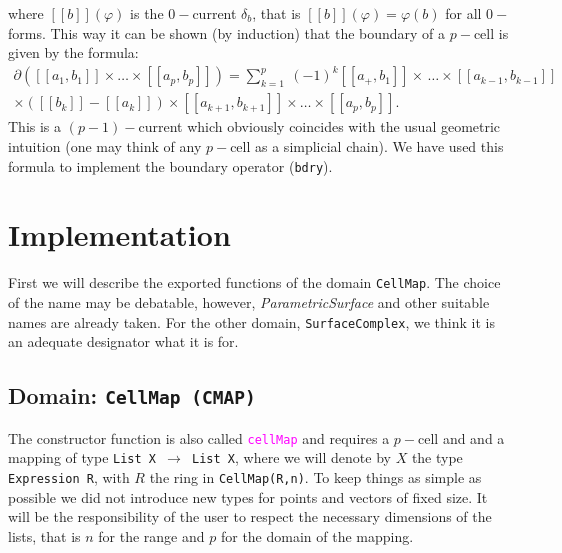\documentclass[12pt,a4paper]{article}
\newcommand{\spadfun}[1]{\textcolor{magenta}{\tt #1}}
\begin{document}
where $[[b]](\varphi)$ is the $0-$current $\delta_b$, that is
$[[b]](\varphi)=\varphi(b)$ for all $0-$forms. This way it can 
be shown (by induction) that the boundary of a $p-$cell is given
by the formula:
\begin{eqnarray*}
 \partial([[a_1,b_1]]\times\ldots\times[[a_p,b_p]]) = \sum_{k=1}^p\ 
 (-1)^k [[a_+,b_1]]\times\,\ldots\times[[a_{k-1},b_{k-1}]] \\ 
 \times([[b_k]] - [[a_k]])\times [[a_{k+1},b_{k+1}]]\times\ldots\times
 [[a_{p},b_{p}]].
\end{eqnarray*}
This is a $(p-1)-$current which obviously coincides
with the usual geometric intuition (one may think of any $p-$cell as
a simplicial chain). We have used this formula to implement the boundary
operator ({\tt bdry}). 
%
\section{Implementation}
First we will describe the exported functions of the domain
{\tt CellMap}. The choice of the name may be debatable, however,
{\em ParametricSurface} and other suitable names are already taken.
For the other domain, {\tt SurfaceComplex}, we think it is an 
adequate designator what it is for.
\subsection{Domain: {\tt CellMap (CMAP)}}
The constructor function is also called \spadfun{cellMap} and requires
a $p-$cell and and a mapping of type {\tt List X $\rightarrow$ List X},
where we will denote by $X$ the type {\tt Expression R}, with $R$ the
ring in {\tt CellMap(R,n)}. To keep things as simple as possible we
did not introduce new types for points and vectors of fixed size. It
will be the responsibility of the user to respect the necessary 
dimensions of the lists, that is $n$ for the range and $p$ for the
domain of the mapping.
\end{document}

